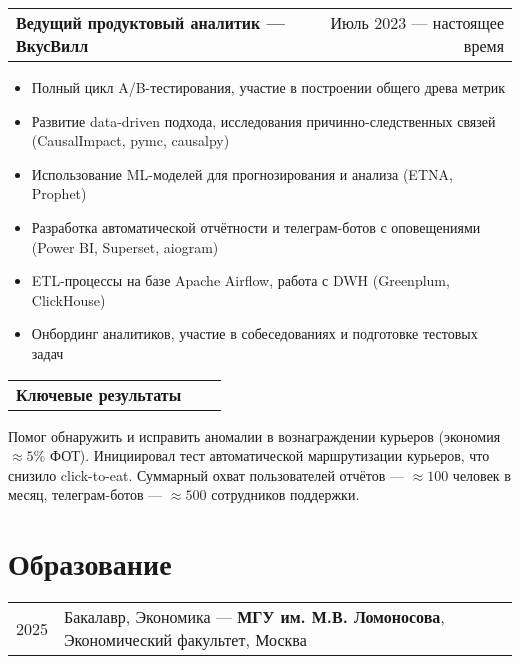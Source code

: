 \documentclass[a4paper,12pt]{article}
\makeatletter
\newenvironment{jobshort}[2]
    {
    \begin{tabularx}{\linewidth}{@{}l X r@{}}
    \textbf{#1} & \hfill &  #2 \\[3.75pt]
    \end{tabularx}
    \begin{minipage}[t]{\linewidth}
    }
    {
    \end{minipage}    
    }
\newenvironment{joblong}[2]
    {
    \begin{tabularx}{\linewidth}{@{}l X r@{}}
    \textbf{#1} & \hfill &  #2 \\[3.75pt]
    \end{tabularx}
    \begin{minipage}[t]{\linewidth}
    \begin{itemize}[nosep,after=\strut, leftmargin=1em, itemsep=3pt,label=--]
    }
    {
    \end{itemize}
    \end{minipage}    
    }
\makeatother
\begin{document}
\begin{joblong}{Ведущий продуктовый аналитик — ВкусВилл}{Июль 2023 — настоящее время}
\item Полный цикл A/B-тестирования, участие в построении общего древа метрик
\item Развитие data-driven подхода, исследования причинно-следственных связей (CausalImpact, pymc, causalpy)
\item Использование ML-моделей для прогнозирования и анализа (ETNA, Prophet)
\item Разработка автоматической отчётности и телеграм-ботов с оповещениями (Power BI, Superset, aiogram)
\item ETL-процессы на базе Apache Airflow, работа с DWH (Greenplum, ClickHouse)
\item Онбординг аналитиков, участие в собеседованиях и подготовке тестовых задач
\end{joblong}

\begin{jobshort}{Ключевые результаты}{ } 
Помог обнаружить и исправить аномалии в вознаграждении курьеров (экономия $\approx 5\%$ ФОТ). 
Инициировал тест автоматической маршрутизации курьеров, что снизило click-to-eat. 
\newline Суммарный охват пользователей отчётов — $\approx 100$ человек в месяц, телеграм-ботов — $\approx 500$ сотрудников поддержки.
\end{jobshort}
  
%

\section{Образование}
\begin{tabularx}{\linewidth}{@{}l X@{}}	
2025 & Бакалавр, Экономика — \textbf{МГУ им. М.В. Ломоносова}, Экономический факультет, Москва \\
\end{tabularx}
\end{document}
